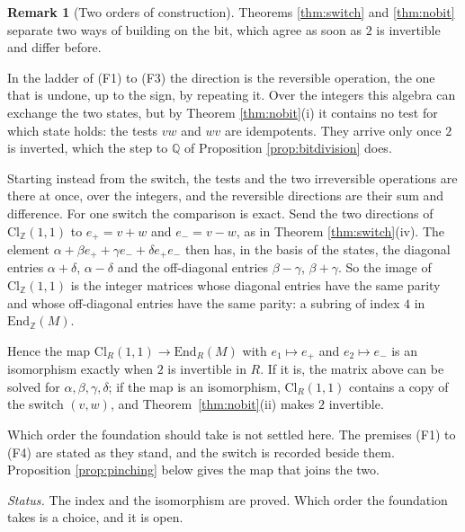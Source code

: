 \documentclass[11pt]{article}
\theoremstyle{plain}
\theoremstyle{definition}
\theoremstyle{plain}
\theoremstyle{definition}
\newtheorem{remark}[theorem]{Remark}
\newcommand{\Cl}{\mathrm{Cl}}
\newcommand{\Z}{\mathbb{Z}}
\newcommand{\Q}{\mathbb{Q}}
\begin{document}
\begin{remark}[Two orders of construction]\label{rem:twoorders}
Theorems \ref{thm:switch} and \ref{thm:nobit} separate two ways of building on the bit, which agree as soon as $2$ is invertible and differ before.

In the ladder of (F1) to (F3) the direction is the reversible operation, the one that is undone, up to the sign, by repeating it. Over the integers this algebra can exchange the two states, but by Theorem \ref{thm:nobit}(i) it contains no test for which state holds: the tests $vw$ and $wv$ are idempotents. They arrive only once $2$ is inverted, which the step to $\Q$ of Proposition \ref{prop:bitdivision} does.

Starting instead from the switch, the tests and the two irreversible operations are there at once, over the integers, and the reversible directions are their sum and difference. For one switch the comparison is exact. Send the two directions of $\Cl_{\Z}(1,1)$ to $e_{+} = v + w$ and $e_{-} = v - w$, as in Theorem \ref{thm:switch}(iv). The element $\alpha + \beta e_{+} + \gamma e_{-} + \delta e_{+}e_{-}$ then has, in the basis of the states, the diagonal entries $\alpha + \delta$, $\alpha - \delta$ and the off-diagonal entries $\beta - \gamma$, $\beta + \gamma$. So the image of $\Cl_{\Z}(1,1)$ is the integer matrices whose diagonal entries have the same parity and whose off-diagonal entries have the same parity: a subring of index $4$ in $\mathrm{End}_{\Z}(M)$.

Hence the map $\Cl_{R}(1,1) \to \mathrm{End}_{R}(M)$ with $e_{1} \mapsto e_{+}$ and $e_{2} \mapsto e_{-}$ is an isomorphism exactly when $2$ is invertible in $R$. If it is, the matrix above can be solved for $\alpha, \beta, \gamma, \delta$; if the map is an isomorphism, $\Cl_{R}(1,1)$ contains a copy of the switch $(v, w)$, and Theorem~\ref{thm:nobit}(ii) makes $2$ invertible.

Which order the foundation should take is not settled here. The premises (F1) to (F4) are stated as they stand, and the switch is recorded beside them. Proposition \ref{prop:pinching} below gives the map that joins the two.

\emph{Status.} The index and the isomorphism are proved. Which order the foundation takes is a choice, and it is open.
\end{remark}
\end{document}
